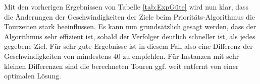 \documentclass[german,version-2019-11]{uzl-thesis}
\begin{document}
\begin{table}[htpb]
\centering
{}
\caption{Ziele mit gleichen Geschwindigkeiten im Prioritäts-Algorithmus}
\label{tab:ExpPrio}
\end{table}

Mit den vorherigen Ergebnissen von Tabelle \ref{tab:ExpGüte} wird nun klar, dass die Änderungen der Geschwindigkeiten der Ziele beim Prioritäts-Algorithmus die Tourzeiten stark beeinflussen. Es kann nun grundsätzlich gesagt werden, dass der Algorithmus sehr effizient ist, sobald der Verfolger deutlich schneller ist, als jedes gegebene Ziel. Für sehr gute Ergebnisse ist in diesem Fall also eine Differenz der Geschwindigkeiten von mindestens $40$ zu empfehlen. Für Instanzen mit sehr kleinen Differenzen sind die berechneten Touren ggf. weit entfernt von einer optimalen Lösung. 

\end{document}
